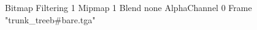 {Bitmap
	{Filtering 1}
	{Mipmap 1}
	{Blend none}
	{AlphaChannel 0}
	{Frame "trunk_treeb#bare.tga"}
}
